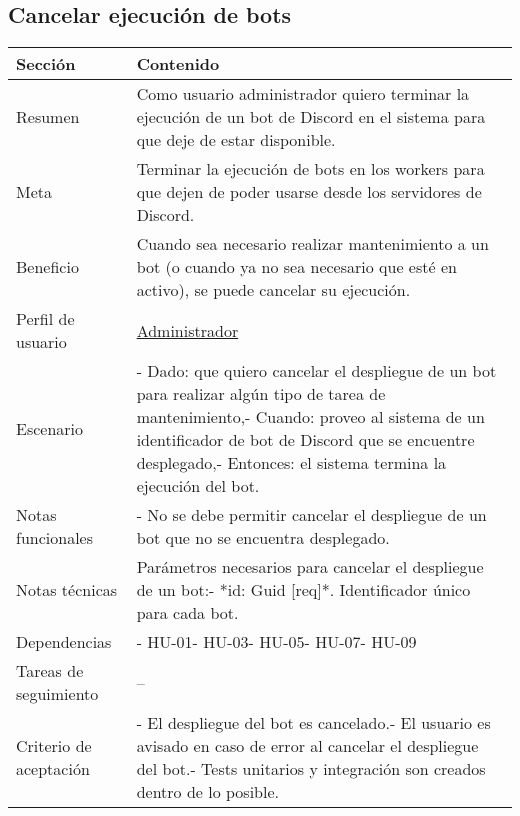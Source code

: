\subsection{Cancelar ejecución de bots}

\begin{table}[H]
    \centering
    \begin{adjustbox}{max width=\textwidth}
    \begin{tabularx}{\textwidth}{|l|L|}
    \hline
        Sección & Contenido \\ \hline
        Resumen & Como usuario administrador quiero terminar la ejecución de un bot de Discord en el sistema para que deje de estar disponible. \\ \hline
        Meta & Terminar la ejecución de bots en los workers para que dejen de poder usarse desde los servidores de Discord. \\ \hline
        Beneficio & Cuando sea necesario realizar mantenimiento a un bot (o cuando ya no sea necesario que esté en activo), se puede cancelar su ejecución. \\ \hline
        Perfil de usuario & \hyperref[sec:personaAdmin]{Administrador} \\ \hline
        Escenario & - Dado: que quiero cancelar el despliegue de un bot para realizar algún tipo de tarea de mantenimiento,\linebreak - Cuando: proveo al sistema de un identificador de bot de Discord que se encuentre desplegado,\linebreak - Entonces: el sistema termina la ejecución del bot. \\ \hline
        Notas funcionales & - No se debe permitir cancelar el despliegue de un bot que no se encuentra desplegado. \\ \hline
        Notas técnicas & Parámetros necesarios para cancelar el despliegue de un bot:\linebreak - *id: Guid [req]*. Identificador único para cada bot. \\ \hline
        Dependencias & - HU-01\linebreak - HU-03\linebreak - HU-05\linebreak - HU-07\linebreak - HU-09 \\ \hline
        Tareas de seguimiento & – \\ \hline
        Criterio de aceptación & - El despliegue del bot es cancelado.\linebreak - El usuario es avisado en caso de error al cancelar el despliegue del bot.\linebreak - Tests unitarios y integración son creados dentro de lo posible. \\ \hline
    \end{tabularx}
    \end{adjustbox}
\end{table}

